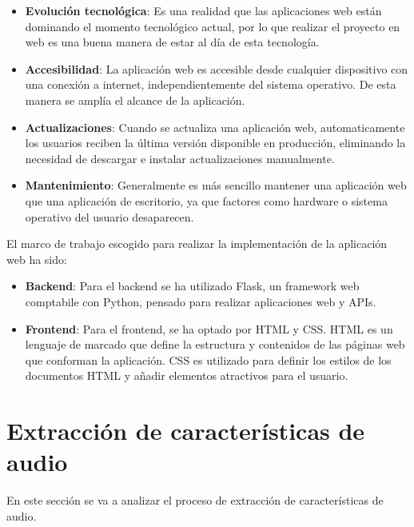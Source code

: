 \begin{itemize}

\item \textbf{Evolución tecnológica}: Es una realidad que las aplicaciones web están dominando el momento tecnológico actual, por lo que realizar el proyecto en web es una buena manera de estar al día de esta tecnología.

\item \textbf{Accesibilidad}: La aplicación web es accesible desde cualquier dispositivo con una conexión a internet, independientemente del sistema operativo. De esta manera se amplía el alcance de la aplicación.

\item \textbf{Actualizaciones}: Cuando se actualiza una aplicación web, automaticamente los usuarios reciben la última versión disponible en producción, eliminando la necesidad de descargar e instalar actualizaciones manualmente. 

\item \textbf{Mantenimiento}: Generalmente es más sencillo mantener una aplicación web que una aplicación de escritorio, ya que factores como hardware o sistema operativo del usuario desaparecen.
\end{itemize}

El marco de trabajo escogido para realizar la implementación de la aplicación web ha sido:

\begin{itemize}

\item \textbf{Backend}: Para el backend se ha utilizado Flask, un framework web comptabile con Python, pensado para realizar aplicaciones web y APIs.

\item \textbf{Frontend}: Para el frontend, se ha optado por HTML y CSS. HTML es un lenguaje de marcado que define la estructura y contenidos de las páginas web que conforman la aplicación. CSS es utilizado para definir los estilos de los documentos HTML y añadir elementos atractivos para el usuario.

\end{itemize}

\newpage

\section{Extracción de características de audio}

En este sección se va a analizar el proceso de extracción de características de audio.

